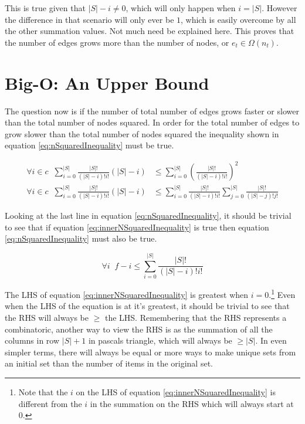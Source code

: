 \documentclass{article}
\begin{document}
This is true given that $|S|-i\neq0$, which will only happen when $i=|S|$. However the difference in that scenario will only ever be $1$, which is easily overcome by all the other summation values. Not much need be explained here. This proves that the number of edges grows more than the number of nodes, or $e_t\in \Omega(n_t)$.

\section{Big-O: An Upper Bound}
\label{sec:UpperBound}

The question now is if the number of total number of edges grows faster or slower than the total number of nodes squared. In order for the total number of edges to grow slower than the total number of nodes squared the inequality shown in equation \ref{eq:nSquaredInequality} must be true.

\begin{equation}
    \begin{split}
        \forall i\in c\;\; \sum_{i=0}^{|S|}\frac{|S|!}{(|S|-i)!i!}(|S|-i) & \le \sum_{i=0}^{|S|}\left(\frac{|S|!}{(|S|-i)!i!}\right)^2
        \\
        \forall i\in c\;\; \sum_{i=0}^{|S|}\frac{|S|!}{(|S|-i)!i!}(|S|-i) & \le \sum_{i=0}^{|S|}\frac{|S|!}{(|S|-i)!i!}\sum_{j=0}^{|S|}\frac{|S|!}{(|S|-j)!j!}
    \end{split}
    \label{eq:nSquaredInequality}
\end{equation}

Looking at the last line in equation \ref{eq:nSquaredInequality}, it should be trivial to see that if equation \ref{eq:innerNSquaredInequality} is true then equation \ref{eq:nSquaredInequality} must also be true.

\begin{equation}
    \forall i\;\; f-i\le\sum_{i=0}^{|S|}\frac{|S|!}{(|S|-i)!i!}
    \label{eq:innerNSquaredInequality}
\end{equation}

The LHS of equation \ref{eq:innerNSquaredInequality} is greatest when $i=0$.\footnote{Note that the $i$ on the LHS of equation \ref{eq:innerNSquaredInequality} is different from the $i$ in the summation on the RHS which will always start at $0$.} Even when the LHS of the equation is at it's greatest, it should be trivial to see that the RHS will always be $\ge$ the LHS. Remembering that the RHS represents a combinatoric, another way to view the RHS is as the summation of all the columns in row $|S|+1$ in pascals triangle, which will always be $\ge|S|$. In even simpler terms, there will always be equal or more ways to make unique sets from an initial set than the number of items in the original set.
\end{document}
